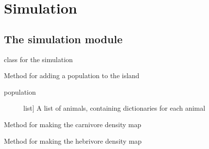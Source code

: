 \documentclass[a4paper,10pt,english]{sphinxmanual}
\begin{document}
\chapter{Simulation}
\label{\detokenize{simulation::doc}}\label{\detokenize{simulation:simulation}}

\section{The simulation module}
\label{\detokenize{simulation:the-simulation-module}}\label{\detokenize{simulation:module-biosim.simulation}}

\begin{fulllineitems}
\label{\detokenize{simulation:biosim.simulation.BioSim}}
class for the simulation

\begin{fulllineitems}
\label{\detokenize{simulation:biosim.simulation.BioSim.add_population}}
Method for adding a population to the island
\begin{description}
\item[{population}] \leavevmode{[}list{]}
A list of animals, containing dictionaries for each animal

\end{description}

\end{fulllineitems}


\begin{fulllineitems}
\label{\detokenize{simulation:biosim.simulation.BioSim.make_carnivore_density_map}}
Method for making the carnivore density map

\end{fulllineitems}


\begin{fulllineitems}
\label{\detokenize{simulation:biosim.simulation.BioSim.make_herbivore_density_map}}
Method for making the hebrivore density map


\end{fulllineitems}
\end{fulllineitems}
\end{document}
